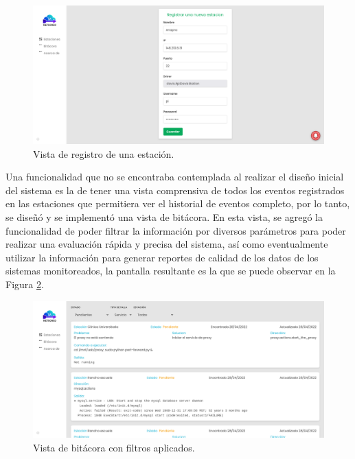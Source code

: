 \begin{figure}[!ht]
   \centering
   \includegraphics[width=1\linewidth]{images/screenshots/1.0.0-register_station.png}
   \caption{Vista de registro de una estación.}
   \label{fig:reigster-station}
\end{figure}

Una funcionalidad que no se encontraba contemplada al realizar el diseño inicial del sistema es la de tener una vista comprensiva de todos los eventos registrados en las estaciones que permitiera ver el historial de eventos completo, por lo tanto, se diseñó y se implementó una vista de bitácora. En esta vista, se agregó la funcionalidad de poder filtrar la información por diversos parámetros para poder realizar una evaluación rápida y precisa del sistema, así como eventualmente utilizar la información para generar reportes de calidad de los datos de los sistemas monitoreados, la pantalla resultante es la que se puede observar en la Figura \ref{fig:bitacora-filters}.

\begin{figure}[!ht]
   \centering
   \includegraphics[width=1\linewidth]{images/screenshots/2.0.0-bitacora-filters.png}
   \caption{Vista de bitácora con filtros aplicados.}
   \label{fig:bitacora-filters}
\end{figure}

